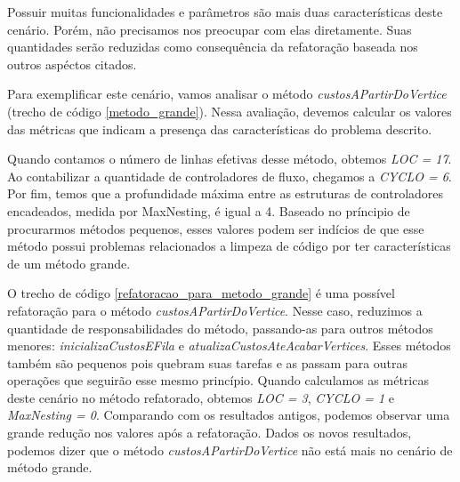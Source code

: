 Possuir muitas funcionalidades e parâmetros são mais duas características deste cenário. Porém, não precisamos nos preocupar com elas diretamente. Suas quantidades serão reduzidas como consequência da refatoração baseada nos outros aspéctos citados.

Para exemplificar este cenário, vamos analisar o método \textit{custosAPartirDoVertice} (trecho de código \ref{metodo_grande}). Nessa avaliação, devemos calcular os valores das métricas que indicam a presença das características do problema descrito. 
                                                                                                                         
                                                            

Quando contamos o número de linhas efetivas desse método, obtemos \textit{LOC = 17}. Ao contabilizar a quantidade de controladores de fluxo, chegamos a \textit{CYCLO = 6}. Por fim, temos que a profundidade máxima entre as estruturas de controladores encadeados, medida por MaxNesting, é igual a 4. Baseado no príncipio de procurarmos métodos pequenos, esses valores podem ser indícios de que esse método possui problemas relacionados a limpeza de código por ter características de um método grande.
                                                      
O trecho de código \ref{refatoracao_para_metodo_grande} é uma possível refatoração para o método \textit{custosAPartirDoVertice}. Nesse caso, reduzimos a quantidade de responsabilidades do método, passando-as para outros métodos menores: \textit{inicializaCustosEFila} e \textit{atualizaCustosAteAcabarVertices}. Esses métodos também são pequenos pois quebram suas tarefas e as passam para outras operações que seguirão esse mesmo princípio. Quando calculamos as métricas deste cenário no método refatorado, obtemos \textit{LOC = 3}, \textit{CYCLO = 1} e \textit{MaxNesting = 0}. Comparando com os resultados antigos, podemos observar uma grande redução nos valores após a refatoração. Dados os novos resultados, podemos dizer que o método \textit{custosAPartirDoVertice} não está mais no cenário de método grande.

                                                            

